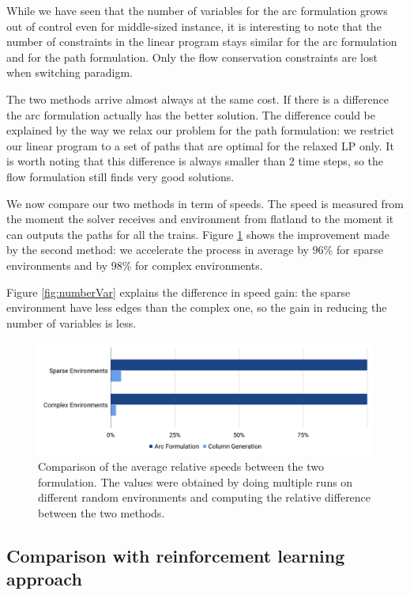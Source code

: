 \documentclass[14pt,a4paper]{article}
\theoremstyle{definition}
\numberwithin{equation}{subsection}
\begin{document}
While we have seen that the number of variables for the arc formulation grows out of control even for middle-sized instance, it is interesting to note that the number of constraints in the linear program stays similar for the arc formulation and for the path formulation. Only the flow conservation constraints are lost when switching paradigm.

The two methods arrive almost always at the same cost. If there is a difference the arc formulation actually has the better solution. The difference could be explained by the way we relax our problem for the path formulation: we restrict our linear program to a set of paths that are optimal for the relaxed LP only. It is worth noting that this difference is always smaller than 2 time steps, so the flow formulation still finds very good solutions.

We now compare our two methods in term of speeds. The speed is measured from the moment the solver receives and environment from flatland to the moment it can outputs the paths for all the trains. Figure \ref{fig:comparison} shows the improvement made by the second method: we accelerate the process in average by $96\%$ for sparse environments and by $98\%$ for complex environments.

Figure \ref{fig:numberVar} explains the difference in speed gain: the sparse environment have less edges than the complex one, so the gain in reducing the number of variables is less. 

\begin{figure}[h]
	\centering
	\includegraphics[width=\linewidth]{img/comparison.png}
	\caption{Comparison of the average relative speeds between the two formulation. The values were obtained by doing multiple runs on different random environments and computing the relative difference between the two methods.}
	\label{fig:comparison}
\end{figure}



\subsection{Comparison with reinforcement learning approach}
\end{document}
